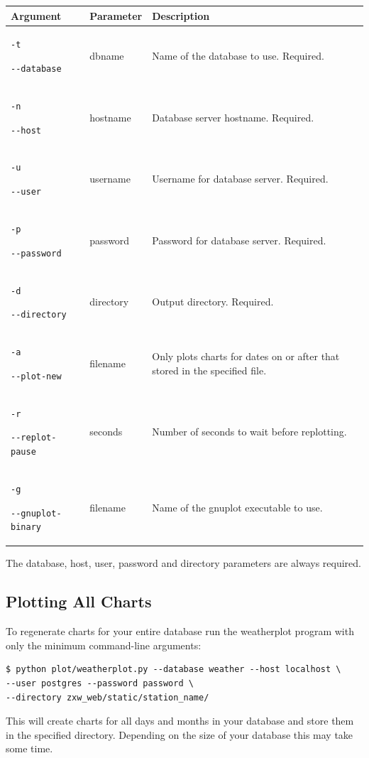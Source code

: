 \documentclass[a4paper,10pt,draft]{book}
\begin{document}
\begin{tabular}{p{3.4cm} l p{8cm}}
\hline
\textbf{Argument} & \textbf{Parameter} & \textbf{Description} \\
\hline
\verb|-t| \par \verb|--database| & dbname & Name of the database to use. Required. \\
\verb|-n| \par \verb|--host| & hostname & Database server hostname. Required. \\
\verb|-u| \par \verb|--user| & username & Username for database server. Required. \\
\verb|-p| \par \verb|--password| & password & Password for database server. Required. \\
\verb|-d| \par \verb|--directory| & directory & Output directory. Required. \\
\verb|-a| \par \verb|--plot-new| & filename & Only plots charts for dates on or after that stored in the specified file. \\
\verb|-r| \par \verb|--replot-pause| & seconds & Number of seconds to wait before replotting.\\
\verb|-g| \par \verb|--gnuplot-binary| & filename & Name of the gnuplot executable to use.\\
\hline
\end{tabular}

The database, host, user, password and directory parameters are always required.

\subsection{Plotting All Charts}

To regenerate charts for your entire database run the weatherplot program with only the minimum command-line arguments:

\begin{verbatim}
$ python plot/weatherplot.py --database weather --host localhost \
--user postgres --password password \
--directory zxw_web/static/station_name/
\end{verbatim}

This will create charts for all days and months in your database and store them in the specified directory. Depending on the size of your database this may take some time.
\end{document}
